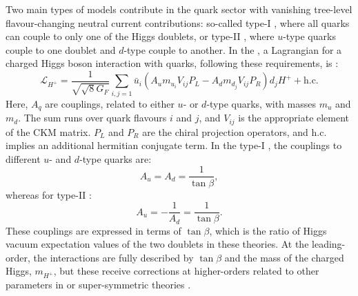Two main types of \TwoHDM models contribute in the quark sector with vanishing tree-level flavour-changing neutral current contributions:
so-called type-I \TwoHDM, where all quarks can couple to only one of the Higgs doublets, or
type-II \TwoHDM, where $u$-type quarks couple to one doublet and $d$-type couple to another.
In the \SM, a Lagrangian for a charged Higgs boson interaction with quarks, following these requirements, is \cite{Hermann:2012fc}:
\begin{equation}
    \mathcal{L}_{H^+} = \frac{1}{\sqrt{\sqrt8G_F}} \sum_{i,j=1} \bar{u}_i (A_u m_{u_i}V_{ij}P_L - A_d m_{d_j}V_{ij}P_R)d_jH^+ + \mathrm{h.c}.
\end{equation}
Here, $A_q$ are couplings, related to either $u$- or $d$-type quarks, with masses $m_u$ and $m_d$.
The sum runs over quark flavours $i$ and $j$, and $V_{ij}$ is the appropriate element of the CKM matrix.
$P_L$ and $P_R$ are the chiral projection operators, and h.c. implies an additional hermitian conjugate term. 
In the type-I \TwoHDM, the couplings to different $u$- and $d$-type quarks are:
\begin{equation}\label{eq:type1_hdm_couplings}
A_u = A_d = \frac{1}{\tan\beta},
\end{equation}
whereas for type-II \TwoHDM:
\begin{equation}\label{eq:type2_hdm_couplings}
    A_u = - \frac{1}{A_d} = \frac{1}{\tan\beta}.
\end{equation}
These couplings are expressed in terms of $\tan\beta$, which is the ratio of Higgs vacuum expectation values of the two doublets in these theories.
At the leading-order, the interactions are fully described by $\tan\beta$ and the mass of the charged Higgs, $m_{H^+}$, but these receive corrections at higher-orders related to other parameters in \TwoHDM or super-symmetric theories \cite{Feng:1996xv}.

